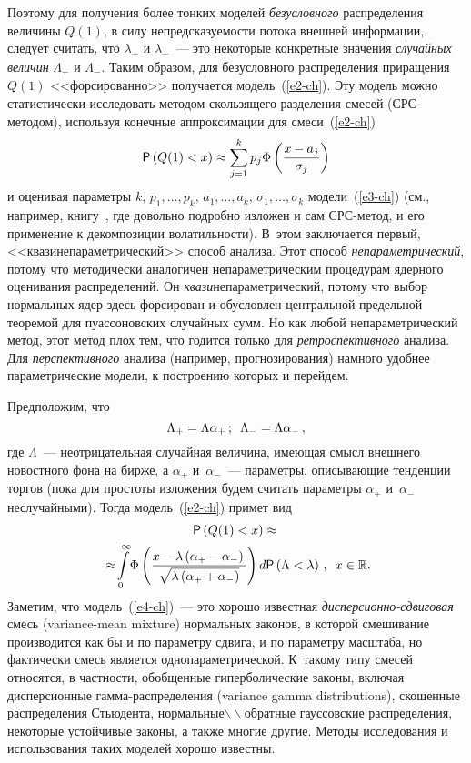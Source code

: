 \begin{multicols}{2}
Поэтому для получения более тонких моделей {\it безусловного}
распределения величины $Q(1)$, в силу непредсказуемости потока
внешней информации, следует считать, что $\lambda_+$ и $\lambda_-$~--- 
это некоторые конкретные значения {\it случайных величин}
$\Lambda_+$ и $\Lambda_-$. Таким образом, для безусловного
распределения приращения $Q(1)$ <<форсированно>> получается модель~(\ref{e2-ch}).
Эту модель можно статистически исследовать методом скользящего
разделения смесей (СРС-ме\-то\-дом), используя конечные аппроксимации
для смеси~(\ref{e2-ch})
\begin{equation}
{\sf
P}\left(Q(1)<x\right)\approx\sum\limits_{j=1}^kp_j\Phi\left(\displaystyle\frac{\displaystyle x-a_j\mathstrut}{\displaystyle \sigma_j\mathstrut}\right)
\label{e3-ch}
\end{equation}
и оценивая параметры
$k,\,p_1,\ldots,p_k,\,a_1,\ldots,a_k$, $\sigma_1,\ldots,\sigma_k$
модели~(\ref{e3-ch}) (см., например, книгу~\cite{Korolev2011-1}, где
довольно подробно изложен и сам СРС-ме\-тод, и его применение к
декомпозиции волатильности). В~этом заключается первый,
<<квазинепараметрический>> способ анализа. Этот способ {\it
непараметрический}, потому что методически аналогичен
непараметрическим процедурам ядерного оценивания распределений. Он
{\it квази}непараметрический, потому что выбор нормальных ядер здесь
форсирован и обусловлен центральной предельной теоремой для
пуассоновских случайных сумм. Но как любой непараметрический метод,
этот метод плох тем, что годится только для {\it ретроспективного}
анализа. Для {\it перспективного} анализа (например,
прогнозирования) намного удобнее параметрические модели, к
построению которых и перейдем.

Предположим, что
$$
\Lambda_+=\Lambda \alpha_+\,;\enskip
\Lambda_-=\Lambda\alpha_-\,,
$$
где $\Lambda$~--- неотрицательная случайная величина, имеющая смысл
внешнего новостного фона на бирже, а $\alpha_+$ и~$\alpha_-$~---
параметры, описывающие тенденции торгов (пока для простоты изложения
будем считать параметры $\alpha_+$ и~$\alpha_-$ неслучайными). Тогда
модель~(\ref{e2-ch}) примет вид
\begin{multline}
{\sf P}\left(Q(1)<x\right)\approx{}\\
\!{}\approx\!\int\limits_{0}^{\infty}\!
\Phi\left(\displaystyle\frac{\displaystyle x-\lambda \left(\alpha_+-\alpha_-\right)\mathstrut}{\displaystyle \sqrt{\lambda
\left(\alpha_++\alpha_-\right)}\mathstrut}\right)d{\sf P}\left(\Lambda<\lambda\right)\,,\enskip
x\in\mathbb{R}.\!\label{e4-ch}
\end{multline}
Заметим, что модель~(\ref{e4-ch})~--- это хорошо известная {\it
дис\-пер\-си\-он\-но-сдви\-го\-вая} смесь (variance-mean mixture) нормальных
законов, в которой смешивание производится как бы и по параметру
сдвига, и по параметру масштаба, но фактически смесь является
однопараметрической. К~такому типу смесей относятся, в частности,
обобщенные гиперболические законы, включая дисперсионные
гам\-ма-рас\-пре\-де\-ле\-ния (variance gamma distributions), скошенные
распределения Стьюдента, нормальные$\backslash\!\backslash$обратные
гауссовские распределения, некоторые устойчивые законы, а также
многие другие. Методы исследования и использования таких моделей
хорошо известны.


\end{multicols}
